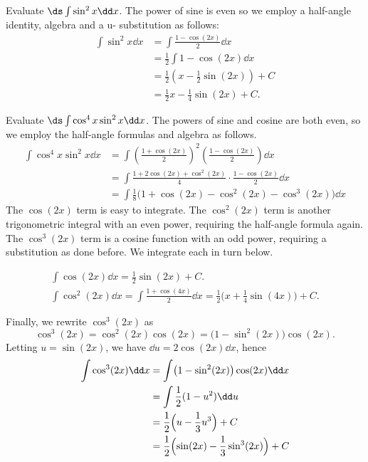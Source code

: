 
\begin{example}\label{ex_sub8}
Evaluate $\ds \int \sin^2x\dd x$.
\solution
The power of sine is even so we employ a half-angle identity, algebra and a u- substitution as follows:
\begin{align*}
	\int \sin^2x\dd x
	&= \int \frac{1-\cos(2x)}2\dd x \\
	&= \frac12\int 1-\cos(2x)\dd x \\
	&= \frac12\left(x - \frac12\sin(2x)\right)+C \\
	&= \frac12x - \frac14\sin(2x) + C.
\end{align*}
\end{example}

\begin{example}\label{ex_trigint3}
Evaluate $\ds\int\cos^4x\sin^2x\dd x$.
\solution
The powers of sine and cosine are both even, so we employ the half-angle formulas and algebra as follows.
\begin{align*}
	\int \cos^4x\sin^2x\dd x
	&= \int\left(\frac{1+\cos(2x)}{2}\right)^2\left(\frac{1-\cos(2x)}2\right)\dd x \\
	&= \int\frac{1+2\cos(2x)+\cos^2(2x)}4\cdot\frac{1-\cos(2x)}2\dd x\\
	&=	\int \frac18\bigl(1+\cos(2x)-\cos^2(2x)-\cos^3(2x)\bigr)\dd x
\end{align*}
The $\cos(2x)$ term is easy to integrate.
The $\cos^2(2x)$ term is another trigonometric integral with an even power, requiring the half-angle formula again. The $\cos^3(2x)$ term is a cosine function with an odd power, requiring a substitution as done before. We integrate each in turn below.

\begin{gather*}
\int\cos(2x)\dd x = \frac12\sin(2x)+C.\\
\int\cos^2(2x)\dd x = \int \frac{1+\cos(4x)}2\dd x
= \frac12\bigl(x+\frac14\sin(4x)\bigr)+C.
\end{gather*}

Finally, we rewrite $\cos^3(2x)$ as
\[\cos^3(2x) = \cos^2(2x)\cos(2x) = \bigl(1-\sin^2(2x)\bigr)\cos(2x).\]
Letting $u=\sin(2x)$, we have $\dd u = 2\cos(2x)\dd x$, hence
\begin{align*}
\int \cos^3(2x)\dd x &= \int\bigl(1-\sin^2(2x)\bigr)\cos(2x)\dd x\\
							&= \int \frac12(1-u^2)\dd u\\
							&= \frac12\Bigl(u-\frac13u^3\Bigr)+C\\
							&=	\frac12\Bigl(\sin(2x)-\frac13\sin^3(2x)\Bigr)+C
\end{align*}


\end{example}
